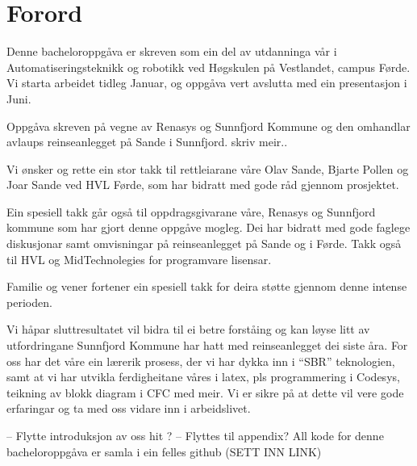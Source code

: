 \chapter{Forord}
\thispagestyle{romanpages}

Denne bacheloroppgåva er skreven som ein del av utdanninga vår i Automatiseringsteknikk og robotikk ved Høgskulen på Vestlandet, campus Førde.
Vi starta arbeidet tidleg Januar, og oppgåva vert avslutta med ein presentasjon i Juni.

Oppgåva skreven på vegne av \gls{Renasys}\citep{Renasys} og \gls{Sunnfjord Kommune}\citep{SunnfjordKommune} og den omhandlar 
avlaups reinseanlegget på Sande i Sunnfjord. skriv meir..

 
Vi ønsker og rette ein stor takk til rettleiarane våre Olav Sande, Bjarte Pollen og Joar Sande ved HVL Førde, som har bidratt med gode råd gjennom prosjektet.

Ein spesiell takk går også til oppdragsgivarane våre, Renasys og Sunnfjord kommune som har gjort denne oppgåve mogleg. Dei har bidratt med gode faglege diskusjonar samt omvisningar på reinseanlegget på Sande og i Førde.
Takk også til HVL og MidTechnolegies for programvare lisensar.

Familie og vener fortener ein spesiell takk for deira støtte gjennom denne intense perioden.

Vi håpar sluttresultatet vil bidra til ei betre forståing og kan løyse litt av utfordringane Sunnfjord Kommune har hatt med reinseanlegget dei siste åra.
For oss har det våre ein lærerik prosess, der vi har dykka inn i ``SBR'' teknologien, samt at vi har utvikla ferdigheitane våres i \gls{latex}, 
pls programmering i \gls{Codesys}, teikning av blokk diagram i CFC med meir. Vi er sikre på at dette vil vere gode erfaringar og ta med oss vidare 
inn i arbeidslivet.


-- Flytte introduksjon av oss hit ? \newline
-- Flyttes til appendix? All kode for denne bacheloroppgåva er samla i ein felles github (SETT INN LINK)
